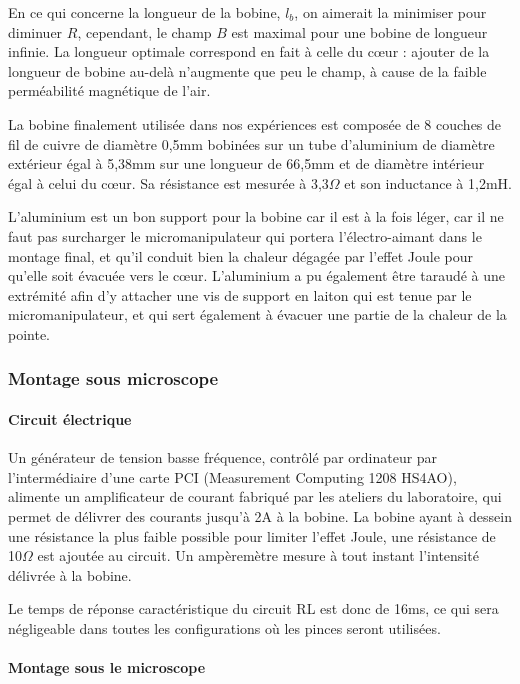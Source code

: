 		En ce qui concerne la longueur de la bobine, $l_b$, on aimerait la minimiser pour diminuer $R$, cependant, le champ $B$ est maximal pour une bobine de longueur infinie. La longueur optimale correspond en fait à celle du c\oe ur : ajouter de la longueur de bobine au-delà n'augmente que peu le champ, à cause de la faible perméabilité magnétique de l'air.
		
		La bobine finalement utilisée dans nos expériences est composée de 8 couches de fil de cuivre de diamètre 0,5mm bobinées sur un tube d'aluminium de diamètre extérieur égal à 5,38mm sur une longueur de 66,5mm et de diamètre intérieur égal à celui du c\oe ur. Sa résistance est mesurée à 3,3$\Omega$ et son inductance à 1,2mH. 
		
		L'aluminium est un bon support pour la bobine car il est à la fois léger, car il ne faut pas surcharger le micromanipulateur qui portera l'électro-aimant dans le montage final, et qu'il conduit bien la chaleur dégagée par l'effet Joule pour qu'elle soit évacuée vers le c\oe ur. L'aluminium a pu également être taraudé à une extrémité afin d'y attacher une vis de support en laiton qui est tenue par le micromanipulateur, et qui sert également à évacuer une partie de la chaleur de la pointe.                       
		\subsubsection{Montage sous microscope}
		\paragraph{Circuit électrique}
		
		Un générateur de tension basse fréquence, contrôlé par ordinateur par l'intermédiaire d'une carte PCI (Measurement Computing 1208 HS4AO), alimente un amplificateur de courant fabriqué par les ateliers du laboratoire, qui permet de délivrer des courants jusqu'à 2A à la bobine. 
		La bobine ayant à dessein une résistance la plus faible possible pour limiter l'effet Joule, une résistance de 10$\Omega$ est ajoutée au circuit. Un ampèremètre mesure à tout instant l'intensité délivrée à la bobine. 
		
		Le temps de réponse caractéristique du circuit RL est donc de 16ms, ce qui sera négligeable dans toutes les configurations où les pinces seront utilisées. 
		
		 \paragraph{Montage sous le microscope}
		 
